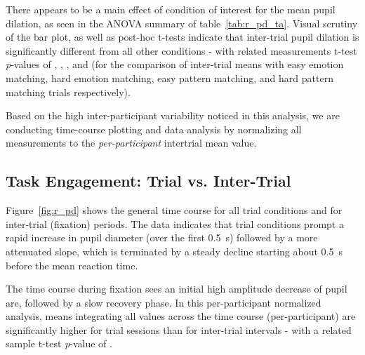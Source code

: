 	    There appears to be a main effect of condition of interest for the mean pupil dilation, as seen in the ANOVA summary of table~\ref{tab:r_pd_ta}.
	    Visual scrutiny of the bar plot, as well as post-hoc t-tests indicate that inter-trial pupil dilation is significantly different from all other conditions - 
	    with related measurements t-test \textit{p}-values of 
	    ,
	    ,
	    , and
	    (for the comparison of inter-trial means with easy emotion matching, hard emotion matching, easy pattern matching, and hard pattern matching trials respectively).
	    
	    Based on the high inter-participant variability noticed in this analysis, we are conducting time-course plotting and data analysis by normalizing all measurements to the \textit{per-participant} intertrial mean value.

	
	\subsection{Task Engagement: Trial vs. Inter-Trial}\label{sec:r_pd_ti}
	    Figure~\ref{fig:r_pd} shows the general time course for all trial conditions and for inter-trial (fixation) periods.
	    The data indicates that trial conditions prompt a rapid increase in pupil diameter (over the first \SI{0.5}{\second}) followed by a more attenuated slope, which is terminated by a steady decline starting about \SI{0.5}{\second} before the mean reaction time.
	    
	    The time course during fixation sees an initial high amplitude decrease of pupil are, followed by a slow recovery phase.
	    In this per-participant normalized analysis, means integrating all values across the time course (per-participant) are significantly higher for trial sessions than for inter-trial intervals - with a related sample t-test \textit{p}-value of 
	    .
